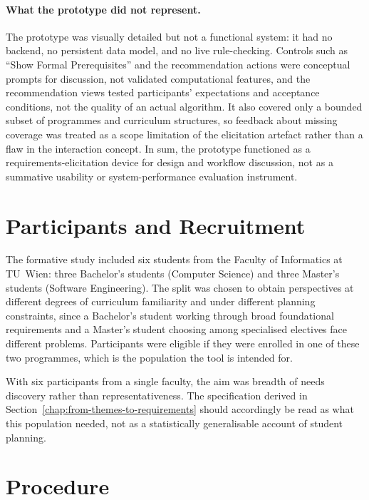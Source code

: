 \paragraph{What the prototype did not represent.}
The prototype was visually detailed but not a functional system: it had no backend, no persistent data model, and no live rule-checking. Controls such as \enquote{Show Formal Prerequisites} and the recommendation actions were conceptual prompts for discussion, not validated computational features, and the recommendation views tested participants' expectations and acceptance conditions, not the quality of an actual algorithm. It also covered only a bounded subset of programmes and curriculum structures, so feedback about missing coverage was treated as a scope limitation of the elicitation artefact rather than a flaw in the interaction concept. In sum, the prototype functioned as a requirements-elicitation device for design and workflow discussion, not as a summative usability or system-performance evaluation instrument.

\section{Participants and Recruitment}
\label{sec:participants-recruitment}

The formative study included six students from the Faculty of Informatics at TU~Wien: three Bachelor's students (Computer Science) and three Master's students (Software Engineering). The split was chosen to obtain perspectives at different degrees of curriculum familiarity and under different planning constraints, since a Bachelor's student working through broad foundational requirements and a Master's student choosing among specialised electives face different problems. Participants were eligible if they were enrolled in one of these two programmes, which is the population the tool is intended for.

With six participants from a single faculty, the aim was breadth of needs discovery rather than representativeness. The specification derived in Section~\ref{chap:from-themes-to-requirements} should accordingly be read as what this population needed, not as a statistically generalisable account of student planning.

\section{Procedure}
\label{sec:procedure}


